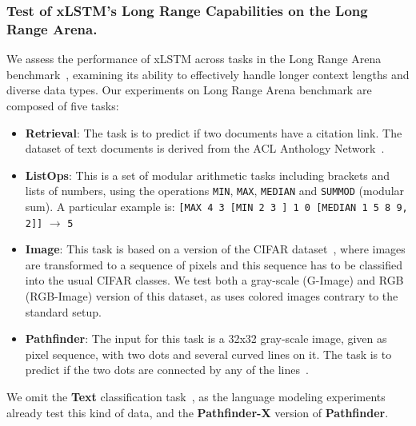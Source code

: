 \documentclass[dvipsnames]{article}
\begin{document}
\begin{appendix}
\subsubsection{Test of xLSTM's Long Range Capabilities on the Long Range Arena.}\label{sec:appExpSynthetic-lra}
We assess the performance of xLSTM across tasks in the Long Range Arena
benchmark~\citep{Tay:21}, examining its ability to effectively handle
longer context lengths and diverse data types.
Our experiments on Long Range Arena benchmark are composed of five tasks:
\begin{itemize}
\item \textbf{Retrieval}: The task is to predict if two documents have a citation link.
The dataset of text documents is derived from the ACL Anthology Network~\citep{Radev:09}.
\item \textbf{ListOps}: This is a set of modular arithmetic tasks including brackets and lists of numbers, using the operations \texttt{MIN}, \texttt{MAX}, \texttt{MEDIAN} and \texttt{SUMMOD} (modular sum).
A particular example is: \texttt{[MAX 4 3 [MIN 2 3 ] 1 0 [MEDIAN 1 5 8 9, 2]]} $\xrightarrow{}$ \texttt{5}
\item \textbf{Image}: This task is based on a version of the CIFAR dataset~\citep{Krizhevsky:09},
where images are transformed to a sequence of pixels and this sequence has to be classified into the usual CIFAR classes.
We test both a gray-scale (G-Image) and RGB (RGB-Image) version of this dataset,
as \citet{Orvieto:23} uses colored images contrary to the standard setup.
\item \textbf{Pathfinder}: The input for this task is a 32x32 gray-scale image, given as pixel sequence,
with two dots and several curved lines on it.
The task is to predict if the two dots are connected by any of the lines~\citep{Linsley:18}.
\end{itemize}
We omit the \textbf{Text} classification task~\citep{Maas:11},
as the language modeling experiments already test this kind of data,
and the \textbf{Pathfinder-X} version of \textbf{Pathfinder}.

\end{appendix}
\end{document}
